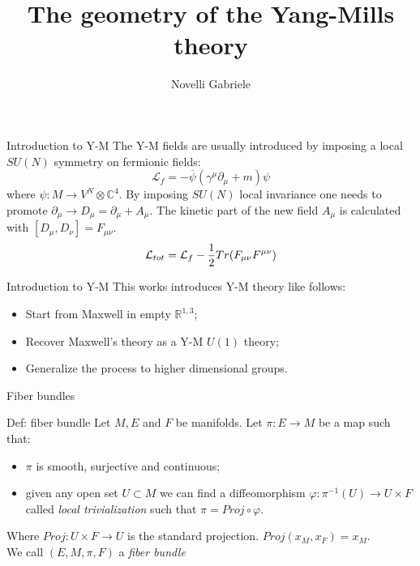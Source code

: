 \documentclass{beamer}
\title{The geometry of the Yang-Mills theory}
\author{Novelli Gabriele}
\begin{document}
\begin{frame}[plain]
    \maketitle
\end{frame}
\begin{frame}{Introduction to Y-M}
	The Y-M fields are usually introduced by imposing a local $SU(N)$ symmetry on fermionic fields:
	$$\mathcal{L}_f=-\overline{\psi}(\gamma^\mu\partial_\mu+m)\psi$$
	where $\psi:M\rightarrow V^N\otimes \mathbb{C}^4$. By imposing $SU(N)$ local invariance one needs to promote $\partial_\mu\rightarrow D_\mu=\partial_\mu+A_\mu$.
	The kinetic part of the new field $A_\mu$ is calculated with $[D_\mu,D_\nu]=F_{\mu\nu}$.
	$$\mathcal{L}_{tot}=\mathcal{L}_f-{1\over 2}Tr(F_{\mu\nu} F^{\mu\nu})$$
\end{frame}
\begin{frame}{Introduction to Y-M}
	This works introduces Y-M theory like follows:
	\begin{itemize}
		\item Start from Maxwell in empty 
		$\mathbb{R}^{1,3}$;
		\item Recover Maxwell's theory as a Y-M $U(1)$ theory;
		\item Generalize the process to higher dimensional groups. 
	\end{itemize}
\end{frame}
\begin{frame}{Fiber bundles}
	\begin{exampleblock}{Def: fiber bundle}
		Let $M, E$ and $F$ be manifolds. Let $\pi: E\rightarrow M$ be a map such that:
		\begin{itemize}
			\item $\pi$ is smooth, surjective and continuous;
			\item given any open set $U\subset M$ we can find a diffeomorphism $\varphi: \pi^{-1}(U)\rightarrow U\times F$ called \textit{local trivialization} such that $\pi=Proj\circ \varphi$.
		\end{itemize}
		Where $Proj: U\times F\rightarrow U$ is the standard projection. $Proj(x_M,x_F)=x_M$.\\
		We call $(E,M,\pi,F)$ a \textit{fiber bundle}
	\end{exampleblock}
\end{frame}
\end{document}
